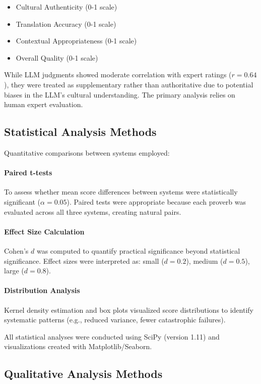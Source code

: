 \begin{itemize}
    \item Cultural Authenticity (0-1 scale)
    \item Translation Accuracy (0-1 scale)
    \item Contextual Appropriateness (0-1 scale)
    \item Overall Quality (0-1 scale)
\end{itemize}

While LLM judgments showed moderate correlation with expert ratings ($r = 0.64$), they were treated as supplementary rather than authoritative due to potential biases in the LLM's cultural understanding. The primary analysis relies on human expert evaluation.

\subsection{Statistical Analysis Methods}
\label{subsec:statistical_methods}

Quantitative comparisons between systems employed:

\paragraph{Paired t-tests} To assess whether mean score differences between systems were statistically significant ($\alpha = 0.05$). Paired tests were appropriate because each proverb was evaluated across all three systems, creating natural pairs.

\paragraph{Effect Size Calculation} Cohen's $d$ was computed to quantify practical significance beyond statistical significance. Effect sizes were interpreted as: small ($d = 0.2$), medium ($d = 0.5$), large ($d = 0.8$).

\paragraph{Distribution Analysis} Kernel density estimation and box plots visualized score distributions to identify systematic patterns (e.g., reduced variance, fewer catastrophic failures).

All statistical analyses were conducted using SciPy (version 1.11) and visualizations created with Matplotlib/Seaborn.

\subsection{Qualitative Analysis Methods}
\label{subsec:qualitative_methods}

